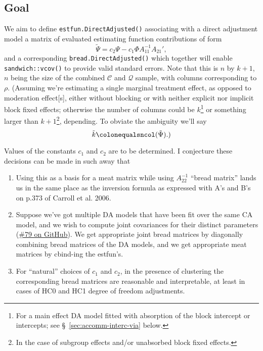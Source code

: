 \documentclass{article}
\newcommand{\defeq}{\ensuremath{\colonequals}}
\begin{document}
\subsection{Goal}
We aim to define \texttt{estfun.DirectAdjusted()} associating
with a direct adjustment model a matrix of evaluated estimating function
contributions of form
\begin{equation*}
  \tilde{\Psi} = c_{2}\Psi - c_{1}\Phi A_{11}^{-1}A_{21}',
\end{equation*}
and a corresponding \texttt{bread.DirectAdjusted()} which together will enable \texttt{sandwich::vcov()} to provide valid standard errors. 
Note that this is $n$ by
$k+1$, $n$ being the size of the combined $\mathcal{C}$ and
$\mathcal{Q}$ sample, with columns corresponding to $\rho$.%
(Assuming we're estimating a single marginal treatment effect, as
opposed to moderation effect[s], either without blocking or with
neither explicit nor implicit block fixed effects; otherwise the
number of columns could be $k$\footnote{For a main effect
DA model fitted with absorption of the block intercept or
intercepts; see \S~\ref{sec:accomm-interc-via} below.} or something
larger than $k+1$\footnote{In the case of subgroup effects and/or unabsorbed block fixed effects.},
depending. To obviate the ambiguity we'll say
\begin{equation*}
  \tilde{k} \defeq \mathtt{ncol}(\tilde{\Psi}).)
\end{equation*}

Values of the constants $c_{1}$ and $c_{2}$ are to be determined.
I conjecture these decisions can be made in such away that 
\begin{enumerate}
\item Using this as a basis for a meat matrix while using
  $A_{22}^{-1}$  ``bread matrix'' lands us in the same place as the
  inversion formula as expressed with A's and B's on p.373 of Carroll
  et al. 2006.
\item Suppose we've got multiple DA models that have been fit over the
  same CA model, and we wish to compute joint covariances for their
  distinct parameters
  (\href{https://github.com/benbhansen-stats/propertee/issues/79}{\#79
    on GitHub}). We get appropriate joint bread matrices by
  diagonally combining bread matrices of the DA models, and we get
  appropriate meat matrices by cbind-ing the estfun's.
\item For ``natural'' choices of $c_{1}$ and $c_{2}$, in the
  presence of clustering the corresponding bread matrices are
  reasonable and interpretable, at least in cases of HC0 and HC1
  degree of freedom adjustments. 
\end{enumerate}
\end{document}
